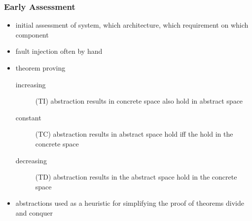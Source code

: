\documentclass[a4paper, 10pt]{article}
\begin{document}
\subsubsection*{Early Assessment}
\begin{itemize}
    \item initial assessment of system, which architecture, which requirement on which component
    \item fault injection often by hand
    \item theorem proving
    \begin{description}
        \item[increasing] (TI) abstraction \follows results in concrete space also hold in abstract space
        \item[constant] (TC) abstraction \follows results in abstract space hold iff the hold in the concrete space
        \item[decreasing] (TD) abstraction \follows results in the abstract space hold in the concrete space
    \end{description}
    \item abstractions used as a heuristic for simplifying the proof of theorems \follows divide and conquer

\end{itemize}
\end{document}

